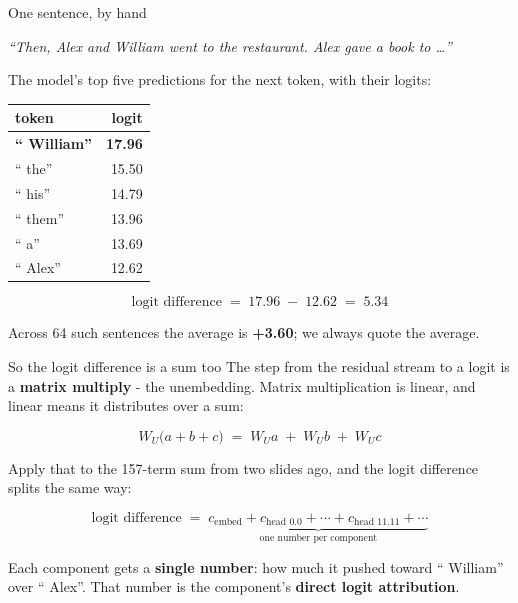 \documentclass[aspectratio=169]{beamer}
\newcommand{\keybox}[1]{%
  \begin{tcolorbox}[colback=armblue!8, colframe=armblue, boxrule=0.6pt, arc=2pt]
  #1
  \end{tcolorbox}}
\newcommand{\promptbox}[1]{%
  \begin{center}
  \begin{tcolorbox}[colback=lightbg, colframe=gray, boxrule=0.5pt, arc=2pt, width=0.88\textwidth]
    \centering\textit{#1}
  \end{tcolorbox}
  \end{center}}
\begin{document}
\begin{frame}{One sentence, by hand}
  \vspace{0.5em}
  \promptbox{``Then, Alex and William went to the restaurant. Alex gave a book to \ldots''}

  \vspace{0.2em}
  The model's top five predictions for the next token, with their logits:

  \vspace{0.4em}
  \begin{center}
  \small
  \begin{tabular}{@{}lr@{}}
    \toprule
    \textbf{token} & \textbf{logit}\\
    \midrule
    \textcolor{paramgreen}{\textbf{`` William''}} & \textcolor{paramgreen}{\textbf{17.96}}\\
    `` the'' & 15.50\\
    `` his'' & 14.79\\
    `` them'' & 13.96\\
    `` a'' & 13.69\\
    \midrule
    \textcolor{armred}{`` Alex''} & \textcolor{armred}{12.62}\\
    \bottomrule
  \end{tabular}
  \end{center}

  \vspace{0.1em}
  \[
    \text{logit difference} \;=\; 17.96 \;-\; 12.62 \;=\; \mathbf{5.34}
  \]

  \vspace{-0.3em}
  {\footnotesize Across 64 such sentences the average is \textbf{+3.60}; we always quote the
  average.}
\end{frame}

\begin{frame}{So the logit difference is a sum too}
  \vspace{0.8em}
  The step from the residual stream to a logit is a \textbf{matrix multiply} - the unembedding.
  Matrix multiplication is linear, and linear means it distributes over a sum:

  \vspace{0.6em}
  \[
    W_U \big( a + b + c \big) \;=\; W_U a \;+\; W_U b \;+\; W_U c
  \]

  \vspace{0.6em}
  Apply that to the 157-term sum from two slides ago, and the logit difference splits the same
  way:

  \vspace{0.2em}
  \[
    \text{logit difference} \;=\;
      \underbrace{c_{\text{embed}} + c_{\text{head 0.0}} + \cdots + c_{\text{head 11.11}}
      + \cdots}_{\text{one number per component}}
  \]

  \vspace{0.5em}
  \keybox{Each component gets a \textbf{single number}: how much it pushed toward `` William''
  over `` Alex''. That number is the component's \textbf{direct logit attribution}.}
\end{frame}
\end{document}
